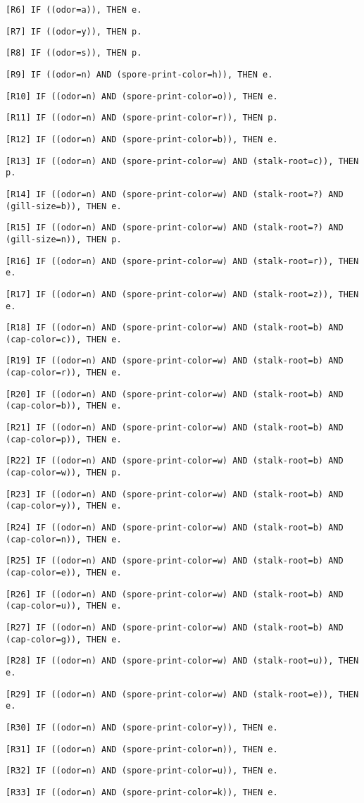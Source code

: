 \documentclass{IEEEtran}
\begin{document}
\texttt{[R6] IF ((odor=a)), THEN e.}

\texttt{[R7] IF ((odor=y)), THEN p.}

\texttt{[R8] IF ((odor=s)), THEN p.}

\texttt{[R9] IF ((odor=n) AND (spore-print-color=h)), THEN e.}

\texttt{[R10] IF ((odor=n) AND (spore-print-color=o)), THEN e.}

\texttt{[R11] IF ((odor=n) AND (spore-print-color=r)), THEN p.}

\texttt{[R12] IF ((odor=n) AND (spore-print-color=b)), THEN e.}

\texttt{[R13] IF ((odor=n) AND (spore-print-color=w) AND
  (stalk-root=c)), THEN p.}

\texttt{[R14] IF ((odor=n) AND (spore-print-color=w) AND (stalk-root=?)
  AND (gill-size=b)), THEN e.}

\texttt{[R15] IF ((odor=n) AND (spore-print-color=w) AND (stalk-root=?)
  AND (gill-size=n)), THEN p.}

\texttt{[R16] IF ((odor=n) AND (spore-print-color=w) AND
  (stalk-root=r)), THEN e.}

\texttt{[R17] IF ((odor=n) AND (spore-print-color=w) AND (stalk-root=z)), THEN
e.}

\texttt{[R18] IF ((odor=n) AND (spore-print-color=w) AND (stalk-root=b) AND
(cap-color=c)), THEN e.}

\texttt{[R19] IF ((odor=n) AND (spore-print-color=w) AND (stalk-root=b) AND
(cap-color=r)), THEN e.}

\texttt{[R20] IF ((odor=n) AND (spore-print-color=w) AND (stalk-root=b) AND
(cap-color=b)), THEN e.}

\texttt{[R21] IF ((odor=n) AND (spore-print-color=w) AND (stalk-root=b) AND
(cap-color=p)), THEN e.}

\texttt{[R22] IF ((odor=n) AND (spore-print-color=w) AND (stalk-root=b) AND
(cap-color=w)), THEN p.}

\texttt{[R23] IF ((odor=n) AND (spore-print-color=w) AND (stalk-root=b) AND
(cap-color=y)), THEN e.}

\texttt{[R24] IF ((odor=n) AND (spore-print-color=w) AND (stalk-root=b) AND
(cap-color=n)), THEN e.}

\texttt{[R25] IF ((odor=n) AND (spore-print-color=w) AND (stalk-root=b) AND
(cap-color=e)), THEN e.}

\texttt{[R26] IF ((odor=n) AND (spore-print-color=w) AND (stalk-root=b) AND
(cap-color=u)), THEN e.}

\texttt{[R27] IF ((odor=n) AND (spore-print-color=w) AND (stalk-root=b) AND
(cap-color=g)), THEN e.}

\texttt{[R28] IF ((odor=n) AND (spore-print-color=w) AND (stalk-root=u)), THEN
e.}

\texttt{[R29] IF ((odor=n) AND (spore-print-color=w) AND (stalk-root=e)), THEN
e.}

\texttt{[R30] IF ((odor=n) AND (spore-print-color=y)), THEN e.}

\texttt{[R31] IF ((odor=n) AND (spore-print-color=n)), THEN e.}

\texttt{[R32] IF ((odor=n) AND (spore-print-color=u)), THEN e.}

\texttt{[R33] IF ((odor=n) AND (spore-print-color=k)), THEN e.}
\end{document}

